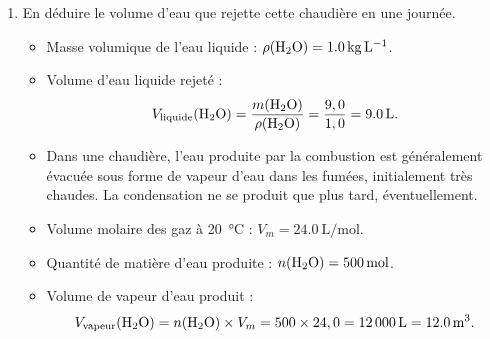 \documentclass[10pt,a4paper]{article}
\newcommand{\correction}[1]{\textcolor{correction}{#1}}
\begin{document}
\begin{enumerate}
    \item En déduire le volume d’eau que rejette cette chaudière en une journée.
    \correction{
        \begin{itemize}
            \item Masse volumique de l’eau liquide : $\rho(\ce{H2O}) = \SI{1,0}{\kilo\gram\per\liter}$.
            \item Volume d’eau liquide rejeté :
            $$
            V_{\text{liquide}}(\ce{H2O}) = \frac{m(\ce{H2O})}{\rho(\ce{H2O})} = \frac{9,0}{1,0} = \SI{9,0}{\liter}.
            $$
            \item Dans une chaudière, l'eau produite par la combustion est généralement évacuée sous forme de vapeur d'eau dans les fumées, initialement très chaudes. La condensation ne se produit que plus tard, éventuellement.
            \item Volume molaire des gaz à \SI{20}{\celsius} : $V_m = \SI{24,0}{\liter\per\mole}$.
            \item Quantité de matière d’eau produite : $n(\ce{H2O}) = \SI{500}{\mole}$.
            \item Volume de vapeur d’eau produit :
            $$
            V_{\text{vapeur}}(\ce{H2O}) = n(\ce{H2O}) \times V_m = 500 \times 24,0 = \SI{12000}{\liter} = \SI{12,0}{\meter\cubed}.
            $$
        \end{itemize}
    }
    
    \end{enumerate}


\end{document}
